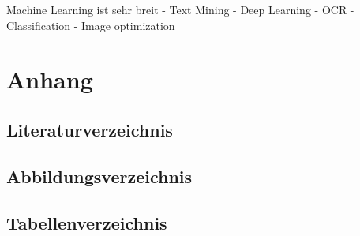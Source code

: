 \documentclass[12pt, twoside]{extarticle}
\begin{document}
Machine Learning ist sehr breit
  - Text Mining
  - Deep Learning
  - OCR
  - Classification
  - Image optimization
  
\newpage
\section{Anhang}

\subsection{Literaturverzeichnis}
{
    \renewcommand{\section}[2]{}%
    
}


\newpage
\subsection{Abbildungsverzeichnis}
{
    \renewcommand{\section}[2]{}%
    \listoffigures
}

\newpage
\subsection{Tabellenverzeichnis}
{
    \renewcommand{\section}[2]{}%
    \listoftables
}
\end{document}
